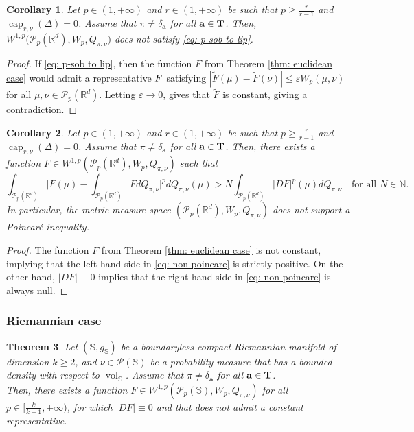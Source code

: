 \documentclass[10pt,leqno]{amsart}
\numberwithin{equation}{section}
\newtheorem{teorema}{Theorem}[section]
\newtheorem{co}[teorema]{Corollary}
\newcommand{\R}{\mathbb{R}}
\newcommand{\N}{\mathbb{N}}
\newcommand{\PP}{\mathcal{P}}
\newcommand{\Ss}{\mathbb{S}}
\begin{document}
\begin{co}\label{co: sob-to-Lip R^d}
     Let $p\in(1,+\infty)$ and $r\in(1,+\infty)$ be such that $p\geq \frac{r}{r-1}$ and $\operatorname{cap}_{r,\nu}(\Delta) = 0$. Assume that $\pi \neq \delta_{\mathbf{a}}$ for all $\mathbf{a}\in \bold{T}$. 
     Then, $W^{1,p}\big(\PP_p(\R^d),W_p,Q_{\pi,\nu}\big)$ does not satisfy \eqref{eq: p-sob to lip}.
\end{co}

\begin{proof}
    If \eqref{eq: p-sob to lip}, then the function $F$ from Theorem \ref{thm: euclidean case} would admit a representative $\Tilde{F}$ satisfying $|\tilde{F}(\mu) - \tilde{F}(\nu)| \leq \varepsilon W_p(\mu,\nu)$ for all $\mu,\nu \in \PP_p(\R^d)$. Letting $\varepsilon\to 0$, gives that $\tilde{F}$ is constant, giving a contradiction.
\end{proof}

\begin{co}\label{co: poincare R^d}
    Let $p\in(1,+\infty)$ and $r\in(1,+\infty)$ be such that $p\geq \frac{r}{r-1}$ and $\operatorname{cap}_{r,\nu}(\Delta) = 0$. Assume that $\pi \neq \delta_{\mathbf{a}}$ for all $\mathbf{a}\in \bold{T}$. 
    Then, there exists a function $F \in W^{1,p}(\PP_p(\R^d),W_p,Q_{\pi,\nu})$ such that 
    \begin{equation}\label{eq: non poincare}
        \int_{\PP_p(\R^d)} \bigg| F(\mu) - \int_{\PP_p(\R^d)} F dQ_{\pi,\nu} \bigg|^p dQ_{\pi,\nu}(\mu) > N \int_{\PP_p(\R^d)} |DF|^p(\mu) dQ_{\pi,\nu} \quad \text{for all }N\in \N.
    \end{equation}
    In particular, the metric measure space $(\PP_p(\R^d),W_p,Q_{\pi,\nu})$ does not support a Poincaré inequality.
\end{co}

\begin{proof}
    The function $F$ from Theorem \ref{thm: euclidean case} is not constant, implying that the left hand side in \eqref{eq: non poincare} is strictly positive. On the other hand, $|DF| \equiv 0$ implies that the right hand side in \eqref{eq: non poincare} is always null. 
\end{proof}

\subsubsection{Riemannian case}

\begin{teorema}\label{thm: manifold case}
    Let $(\mathbb{S},g_{\mathbb{S}})$ be a boundaryless compact Riemannian manifold of dimension $k\geq 2$, and $\nu\in \PP(\mathbb{S})$ be a probability measure that has a bounded density with respect to $\operatorname{vol}_{\mathbb{S}}$. Assume that $\pi \neq \delta_{\mathbf{a}}$ for all $\mathbf{a}\in \bold{T}$.
    \\
    Then, there exists a function $F \in W^{1,p}(\PP_p(\Ss),W_p,Q_{\pi,\nu})$ for all $p\in[\frac{k}{k-1},+\infty)$, for which $|DF| \equiv 0$ and that does not admit a constant representative.
\end{teorema}
\end{document}
